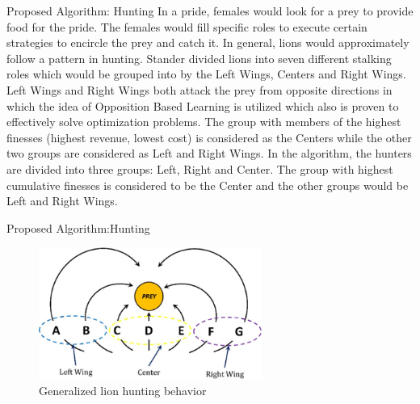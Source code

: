 \documentclass{beamer}
\begin{document}


\begin{frame}{Proposed Algorithm: Hunting}
In a pride, females would look for a prey to provide food for the pride. The females would fill specific roles to execute certain strategies to encircle the prey and catch it. In general, lions would approximately follow a pattern in hunting. Stander divided lions into seven different stalking roles which would be grouped into by the Left Wings, Centers and Right Wings.
Left Wings and Right Wings both attack the prey from opposite directions in which the idea of Opposition Based Learning is utilized which also is proven to effectively solve optimization problems.
The group with members of the highest finesses (highest revenue, lowest cost) is considered as the Centers while the other two groups are considered as Left and Right Wings.
In the algorithm, the hunters are divided into three groups: Left, Right and Center. The group with highest cumulative finesses is considered to be the Center and the other groups would be Left and Right Wings.
\end{frame}
\begin{frame}{Proposed Algorithm:Hunting}
\begin{figure}[h]
\begin{center}
\includegraphics[width=0.65\textwidth]{img/pa/hunting_scheme}
\caption{Generalized lion hunting behavior}
\end{center}
\end{figure}
\end{frame}
\end{document}
